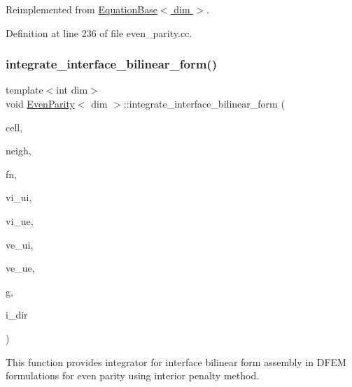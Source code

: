 Reimplemented from \hyperlink{class_equation_base_ae8472f5c20d76c7d01e5660f8377887e}{Equation\+Base$<$ dim $>$}.



Definition at line 236 of file even\+\_\+parity.\+cc.

\mbox{\label{class_even_parity_a0a6674c14f34f22c8ff383aee81ffabf}} 
\subsubsection{\texorpdfstring{integrate\+\_\+interface\+\_\+bilinear\+\_\+form()}{integrate\_interface\_bilinear\_form()}}
{\footnotesize\ttfamily template$<$int dim$>$ \\
void \hyperlink{class_even_parity}{Even\+Parity}$<$ dim $>$\+::integrate\+\_\+interface\+\_\+bilinear\+\_\+form (\begin{DoxyParamCaption}\item[{typename Do\+F\+Handler$<$ dim $>$\+::active\+\_\+cell\+\_\+iterator \&}]{cell,  }\item[{typename Do\+F\+Handler$<$ dim $>$\+::cell\+\_\+iterator \&}]{neigh,  }\item[{unsigned int \&}]{fn,  }\item[{Full\+Matrix$<$ double $>$ \&}]{vi\+\_\+ui,  }\item[{Full\+Matrix$<$ double $>$ \&}]{vi\+\_\+ue,  }\item[{Full\+Matrix$<$ double $>$ \&}]{ve\+\_\+ui,  }\item[{Full\+Matrix$<$ double $>$ \&}]{ve\+\_\+ue,  }\item[{const unsigned int \&}]{g,  }\item[{const unsigned int \&}]{i\+\_\+dir }\end{DoxyParamCaption})\hspace{0.3cm}{\ttfamily [virtual]}}

This function provides integrator for interface bilinear form assembly in D\+F\+EM formulations for even parity using interior penalty method.


